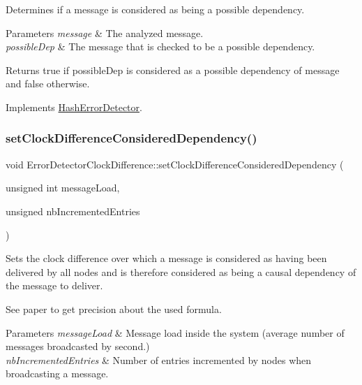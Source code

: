 Determines if a message is considered as being a possible dependency. 


\begin{DoxyParams}{Parameters}
{\em message} & The analyzed message. \\
\hline
{\em possible\+Dep} & The message that is checked to be a possible dependency. \\
\hline
\end{DoxyParams}
\begin{DoxyReturn}{Returns}
true if possible\+Dep is considered as a possible dependency of message and false otherwise. 
\end{DoxyReturn}


Implements \hyperlink{class_hash_error_detector_ac0a25b9c1e27f98223869d11ca46d18f}{Hash\+Error\+Detector}.

\mbox{\label{class_error_detector_clock_difference_a529b87b6eaee9041601af1ca36b51c93}} 
\subsubsection{\texorpdfstring{set\+Clock\+Difference\+Considered\+Dependency()}{setClockDifferenceConsideredDependency()}}
{\footnotesize\ttfamily void Error\+Detector\+Clock\+Difference\+::set\+Clock\+Difference\+Considered\+Dependency (\begin{DoxyParamCaption}\item[{unsigned int}]{message\+Load,  }\item[{unsigned}]{nb\+Incremented\+Entries }\end{DoxyParamCaption})}



Sets the clock difference over which a message is considered as having been delivered by all nodes and is therefore considered as being a causal dependency of the message to deliver. 

See paper to get precision about the used formula. 
\begin{DoxyParams}{Parameters}
{\em message\+Load} & Message load inside the system (average number of messages broadcasted by second.) \\
\hline
{\em nb\+Incremented\+Entries} & Number of entries incremented by nodes when broadcasting a message. \\
\hline
\end{DoxyParams}
\mbox{\label{class_error_detector_clock_difference_a6dafc330591db83f5c5fbee56b2c4937}} 
